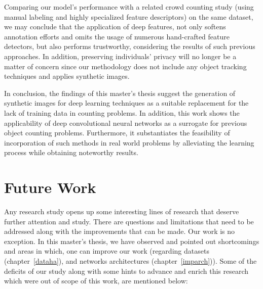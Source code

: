 Comparing our model's performance with a related crowd counting study (using manual labeling and highly specialized feature descriptors) on the same dataset, we may conclude that the application of deep features, not only softens annotation efforts and omits the usage of numerous hand-crafted feature detectors, but also performs trustworthy, considering the results of such previous approaches. In addition, preserving individuals' privacy will no longer be a matter of concern since our methodology does not include any object tracking techniques and applies synthetic images.    

\noindent In conclusion, the findings of this master's thesis suggest the generation of synthetic images for deep learning techniques as a suitable replacement for the lack of training data in counting problems. In addition, this work shows the applicability of deep convolutional neural networks as a surrogate for previous object counting problems. Furthermore, it substantiates the feasibility of incorporation of such methods in real world problems by alleviating the learning process while obtaining noteworthy results.  


\section{Future Work}

Any research study opens up some interesting lines of research that deserve further attention and study. There are questions and limitations that need to be addressed along with the improvements that can be made. Our work is no exception. In this master's thesis, we have observed and pointed out shortcomings and areas in which, one can improve our work (regarding datasets (chapter~\ref{dataha}), and networks architectures (chapter~\ref{imparch})). Some of the deficits of our study along with some hints to advance and enrich this research which were out of scope of this work, are mentioned below:

